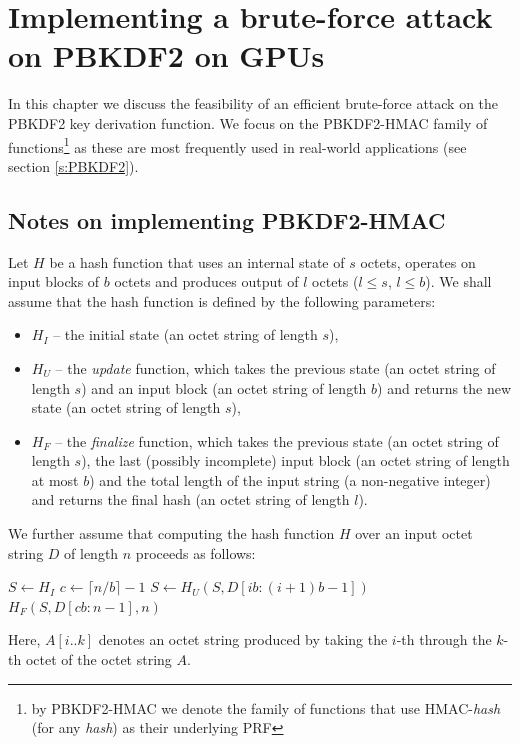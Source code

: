 \documentclass[12pt,oneside]{fithesis2}
\begin{document}
    \chapter{Implementing a brute-force attack on PBKDF2 on GPUs}
      In this chapter we discuss the feasibility of an efficient brute-force attack on the PBKDF2 key derivation function. We focus on the PBKDF2-HMAC family of functions\footnote{by PBKDF2-HMAC we denote the family of functions that use HMAC-\emph{hash} (for any \emph{hash}) as their underlying PRF} as these are most frequently used in real-world applications (see section \ref{s:PBKDF2}).
      
      \section{Notes on implementing PBKDF2-HMAC}
      Let $H$ be a hash function that uses an internal state of $s$ octets, operates on input blocks of $b$ octets and produces output of $l$ octets ($l \le s$, $l \le b$). We shall assume that the hash function is defined by the following parameters:
      \begin{itemize}
        \item $H_I$ -- the initial state (an octet string of length $s$),
        \item $H_U$ -- the \emph{update} function, which takes the previous state (an octet string of length $s$) and an input block (an octet string of length $b$) and returns the new state (an octet string of length $s$),
        \item $H_F$ -- the \emph{finalize} function, which takes the previous state (an octet string of length $s$), the last (possibly incomplete) input block (an octet string of length at most $b$) and the total length of the input string (a non-negative integer) and returns the final hash (an octet string of length $l$).
      \end{itemize}
      We further assume that computing the hash function $H$ over an input octet string $D$ of length $n$ proceeds as follows:
      \begin{algorithmic}[1]
          \State $S \gets H_I$
          \State $c \gets \lceil n / b \rceil - 1$
            \State $S \gets H_U(S, D[ib:(i+1)b-1])$
          \EndFor
          \State \Return $H_F(S, D[cb:n-1], n)$
        \EndFunction
      \end{algorithmic}
      
      Here, $A[i..k]$ denotes an octet string produced by taking the $i$-th through the $k$-th octet of the octet string $A$.
      
\end{document}
